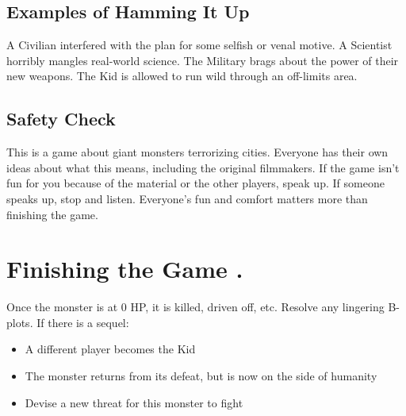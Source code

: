 \documentclass[10pt,oneside,letterpaper,landscape]{memoir}
\newcommand\rep{\leavevmode\xleaders\hbox{.}\hfill\kern0pt}
\begin{document}
\begin{multicols}{3}
\subsection{Examples of Hamming It Up}

A Civilian interfered with the plan for some selfish or venal motive.
A Scientist horribly mangles real-world science.
The Military brags about the power of their new weapons.
The Kid is allowed to run wild through an off-limits area.

\subsection{Safety Check}

This is a game about giant monsters terrorizing cities. Everyone has their own ideas about what this means, including the original filmmakers. If the game isn't fun for you because of the material or the other players, speak up. If someone speaks up, stop and listen. Everyone's fun and comfort matters more than finishing the game.

\columnbreak

\section{Finishing the Game \rep}

Once the monster is at 0 HP, it is killed, driven off, etc. Resolve any lingering B-plots. If there is a sequel:

\begin{itemize}
\item A different player becomes the Kid
\item The monster returns from its defeat, but is now on the side of humanity
\item Devise a new threat for this monster to fight
\end{itemize}

\end{multicols}

\end{document}
